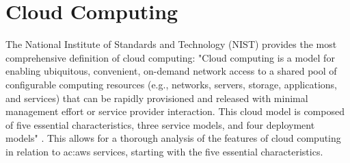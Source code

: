 \section{Cloud Computing}
The National Institute of Standards and Technology (NIST) provides the most comprehensive definition of cloud computing: "Cloud computing is a model for enabling ubiquitous, convenient, on-demand network access to a shared pool of configurable computing resources (e.g., networks, servers, storage, applications, and services) that can be rapidly provisioned and released with minimal management effort or service provider interaction. This cloud model is composed of five essential characteristics, three service models, and four deployment models" \cite{NISTCloudComputing}. This allows for a thorough analysis of the features of cloud computing in relation to \gls{ac:aws} services, starting with the five essential characteristics.
